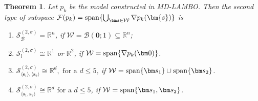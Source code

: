 \documentclass[colorlinks=true, linkcolor=blue, citecolor=blue, urlcolor=blue]{article}
\theoremstyle{plain}
\newtheorem{theorem}{Theorem}[section]
\theoremstyle{definition}
\theoremstyle{remark}
\begin{document}
\begin{theorem}\label{thm:sp. gene. by span+cup}
     Let $p_k$ be the model constructed in MD-LAMBO. Then the second type of subspace $\mathcal{F}(p_k)= {\rm span}\{\bigcup_{\bm s\in\mathcal{W}}\nabla p_k(\bm{s})\}$ is

     \begin{enumerate}
         \item $\mathcal{S}_{\mathcal{B}}^{(2,\sigma)}=\mathbb{R}^n$, if $\mathcal{W}=\mathcal{B}(\bm 0;1)\subseteq \mathbb{R}^n$;
         
         \item $\mathcal{S}_{l}^{(2,\sigma)}\cong \mathbb{R}^1$ or $\mathbb{R}^2$, if $\mathcal{W}={\rm span}\{\nabla p_k(\bm 0)\}$.

         \item $\mathcal{S}_{\langle \bm s_1\rangle,\langle\bm s_2\rangle}^{(2,\sigma)}\cong\mathbb{R}^d,\text{ for a }d\leq 5$, if $\mathcal{W}={\rm span}\{\bm s_1\}\cup{\rm span}\{\bm s_2\}$. 
         
         \item $\mathcal{S}_{\langle\bm s_1,\bm s_2\rangle}^{(2,\sigma)}\cong \mathbb{R}^d\text{ for a }d\leq 5$, if $\mathcal{W}={\rm span}\{\bm s_1,\bm s_2\}$.        
     \end{enumerate}
\end{theorem}
\end{document}

